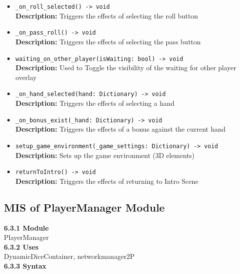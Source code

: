 \documentclass[12pt, titlepage]{article}
\begin{document}
\begin{itemize}
    \item \texttt{\_on\_roll\_selected() -> void}\\
    \textbf{Description:} Triggers the effects of selecting the roll button
    
    \item \texttt{\_on\_pass\_roll() -> void}\\
    \textbf{Description:} Triggers the effects of selecting the pass button
    
    \item \texttt{waiting\_on\_other\_player(isWaiting: bool) -> void}\\
    \textbf{Description:} Used to Toggle the visibility of the waiting for other player overlay
    
    \item \texttt{\_on\_hand\_selected(hand: Dictionary) -> void}\\
    \textbf{Description:} Triggers the effects of selecting a hand
    
    \item \texttt{\_on\_bonus\_exist(\_hand: Dictionary) -> void}\\
    \textbf{Description:} Triggers the effects of a bonus against the current hand
    
    \item \texttt{setup\_game\_environment(\_game\_settings: Dictionary) -> void}\\
    \textbf{Description:} Sets up the game environment (3D elements)
    
    \item \texttt{returnToIntro() -> void}\\
    \textbf{Description:} Triggers the effects of returning to Intro Scene
\end{itemize}

\subsection{MIS of PlayerManager Module}\label{PlayerManager}
\textbf{6.3.1 Module}\\
 PlayerManager\\

\noindent \textbf{6.3.2 Uses}\\
DynamicDiceContainer,  networkmanager2P\\

\noindent \textbf{6.3.3 Syntax}
\end{document}
